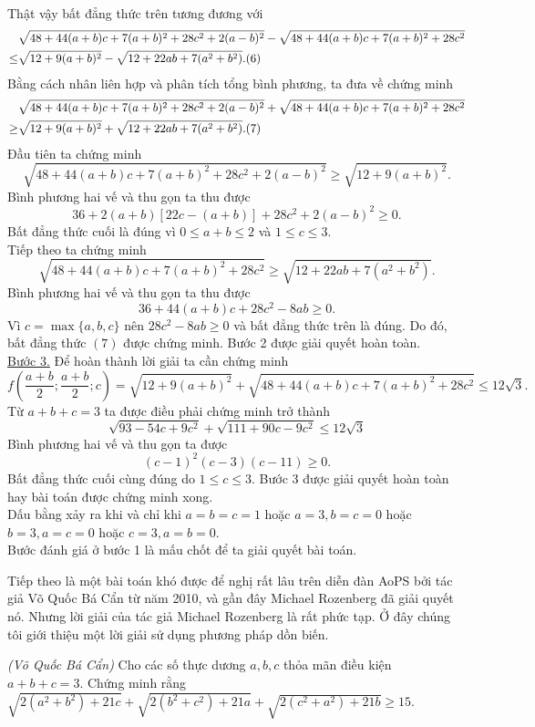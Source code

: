 {\begin{bt}
{		Thật vậy bất đẳng thức trên tương đương với
		\begin{align*}
		&\sqrt{48+44(a+b)c+7(a+b)^2+28c^2+2(a-b)^2}-\sqrt{48+44(a+b)c+7(a+b)^2+28c^2}\\
		\le &\sqrt{12+9(a+b)^2}-\sqrt{12+22ab+7(a^2+b^2)}.\hfill{(6)}
		\end{align*}
		Bằng cách nhân liên hợp và phân tích tổng bình phương, ta đưa về chứng minh
		\begin{align*}
		&\sqrt{48+44(a+b)c+7(a+b)^2+28c^2+2(a-b)^2}+\sqrt{48+44(a+b)c+7(a+b)^2+28c^2}\\
		\ge &\sqrt{12+9(a+b)^2}+\sqrt{12+22ab+7(a^2+b^2)}.\hfill{(7)}
		\end{align*}
		Đầu tiên ta chứng minh 
		$$\sqrt{48+44(a+b)c+7(a+b)^2+28c^2+2(a-b)^2}\ge \sqrt{12+9(a+b)^2}.$$
		Bình phương hai vế và thu gọn ta thu được
		$$36+2(a+b)[22c-(a+b)]+28c^2+2(a-b)^2\ge 0.$$
		Bất đẳng thức cuối là đúng vì $0\le a+b\le 2$ và $1\le c\le 3$.\\
		Tiếp theo ta chứng minh
		$$\sqrt{48+44(a+b)c+7(a+b)^2+28c^2}\ge \sqrt{12+22ab+7(a^2+b^2)}.$$
		Bình phương hai vế và thu gọn ta thu được
		$$36+44(a+b)c+28c^2-8ab\ge 0.$$
		Vì $c=\max \{a,b,c\}$ nên $28c^2-8ab\ge 0$ và bất đẳng thức trên là đúng. Do đó, bất đẳng thức $(7)$ được chứng minh. Bước 2 được giải quyết hoàn toàn.\\
		\underline{Bước 3.} Để hoàn thành lời giải ta cần chứng minh
		$$f\left(\dfrac{a+b}{2};\dfrac{a+b}{2};c\right)= \sqrt{12+9(a+b)^2}+\sqrt{48+44(a+b)c+7(a+b)^2+28c^2}\le 12\sqrt{3}.$$
		Từ $a+b+c=3$ ta được điều phải chứng minh trở thành
		$$\sqrt{93-54c+9c^2}+\sqrt{111+90c-9c^2}\le 12\sqrt{3}$$
		Bình phương hai vế và thu gọn ta được
		$$(c-1)^2(c-3)(c-11)\ge 0.$$
		Bất đẳng thức cuối cùng đúng do $1\le c\le 3$. Bước 3 được giải quyết hoàn toàn hay bài toán được chứng minh xong.\\
		Dấu bằng xảy ra khi và chỉ khi $a=b=c=1$ hoặc $a=3,b=c=0$ hoặc $b=3,a=c=0$ hoặc $c=3,a=b=0$.\\
		Bước đánh giá ở bước 1 là mấu chốt để ta giải quyết bài toán.
	}
\end{bt}
Tiếp theo là một bài toán khó được để nghị rất lâu trên diễn đàn AoPS bởi tác giả Võ Quốc Bá Cẩn từ năm 2010, và gần đây Michael Rozenberg đã giải quyết nó. Nhưng lời giải của tác giả Michael Rozenberg là rất phức tạp. Ở đây chúng tôi giới thiệu một lời giải sử dụng phương pháp dồn biến.
\begin{bt}
	\textit{(Võ Quốc Bá Cẩn)} Cho các số thực dương $a,b,c$ thỏa mãn điều kiện $a+b+c=3$. Chứng minh rằng $\sqrt{2(a^2+b^2)+21c}+\sqrt{2(b^2+c^2)+21a}+\sqrt{2(c^2+a^2)+21b}\ge 15.$ 

\end{bt}}
